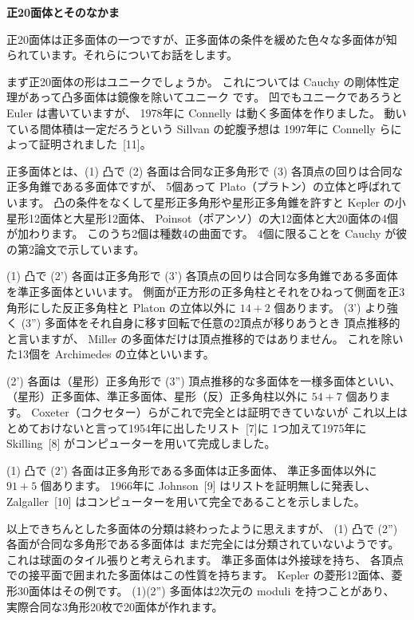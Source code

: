 \documentclass[uplatex,dvipdfmx]{jlreq}
\begin{document}
\begin{center}
{\large\bfseries 正20面体とそのなかま}\\[6pt]
\hspace*{\fill}{\large\bfseries 増田 一男（東工大院・理工）}
\end{center}

正20面体は正多面体の一つですが、正多面体の条件を緩めた色々な多面体が知
られています。それらについてお話をします。

まず正20面体の形はユニークでしょうか。
これについては Cauchy の剛体性定理があって凸多面体は鏡像を除いてユニーク
です。
凹でもユニークであろうと Euler は書いていますが、
1978年に Connelly は動く多面体を作りました。
動いている間体積は一定だろうという Sillvan の蛇腹予想は
1997年に Connelly らによって証明されました~[11]。

正多面体とは、(1) 凸で (2) 各面は合同な正多角形で
(3) 各頂点の回りは合同な正多角錐である多面体ですが、
5個あって Plato（プラトン）の立体と呼ばれています。
凸の条件をなくして星形正多角形や星形正多角錐を許すと
Kepler の小星形12面体と大星形12面体、
Poinsot（ポアンソ）の大12面体と大20面体の4個が加わります。
このうち2個は種数4の曲面です。
4個に限ることを Cauchy が彼の第2論文で示しています。

(1) 凸で (2') 各面は正多角形で
(3') 各頂点の回りは合同な多角錐である多面体を準正多面体といいます。
側面が正方形の正多角柱とそれをひねって側面を正3角形にした反正多角柱と
Platon の立体以外に $14+2$ 個あります。
(3') より強く (3'') 多面体をそれ自身に移す回転で任意の2頂点が移りあうとき
頂点推移的と言いますが、
Miller の多面体だけは頂点推移的ではありません。
これを除いた13個を Archimedes の立体といいます。

(2') 各面は（星形）正多角形で
(3'') 頂点推移的な多面体を一様多面体といい、
（星形）正多面体、準正多面体、星形（反）正多角柱以外に $54+7$ 個あります。
Coxeter（コクセター）らがこれで完全とは証明できていないが
これ以上はとめておけないと言って1954年に出したリスト~[7]に
1つ加えて1975年に Skilling~[8] がコンピューターを用いて完成しました。

(1) 凸で (2') 各面は正多角形である多面体は正多面体、
準正多面体以外に $91+5$ 個あります。
1966年に Johnson~[9] はリストを証明無しに発表し、
Zalgaller~[10] はコンピューターを用いて完全であることを示しました。

以上できちんとした多面体の分類は終わったように思えますが、
(1) 凸で (2'') 各面が合同な多角形である多面体は
まだ完全には分類されていないようです。
これは球面のタイル張りと考えられます。
準正多面体は外接球を持ち、
各頂点での接平面で囲まれた多面体はこの性質を持ちます。
Kepler の菱形12面体、菱形30面体はその例です。
(1)(2'') 多面体は2次元の moduli を持つことがあり、
実際合同な3角形20枚で20面体が作れます。
\end{document}
